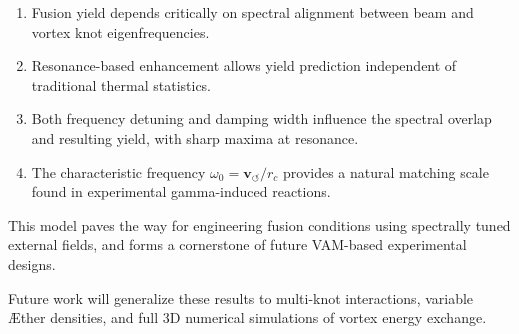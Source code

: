 \begin{enumerate}
  \item Fusion yield depends critically on spectral alignment between beam and vortex knot eigenfrequencies.
  \item Resonance-based enhancement allows yield prediction independent of traditional thermal statistics.
  \item Both frequency detuning and damping width influence the spectral overlap and resulting yield, with sharp maxima at resonance.
  \item The characteristic frequency \( \omega_0 = \mathbf{v}_{\scriptscriptstyle\boldsymbol{\circlearrowleft}} / r_c \) provides a natural matching scale found in experimental gamma-induced reactions.
\end{enumerate}

This model paves the way for engineering fusion conditions using spectrally tuned external fields, and forms a cornerstone of future VAM-based experimental designs.

Future work will generalize these results to multi-knot interactions, variable Æther densities, and full 3D numerical simulations of vortex energy exchange.